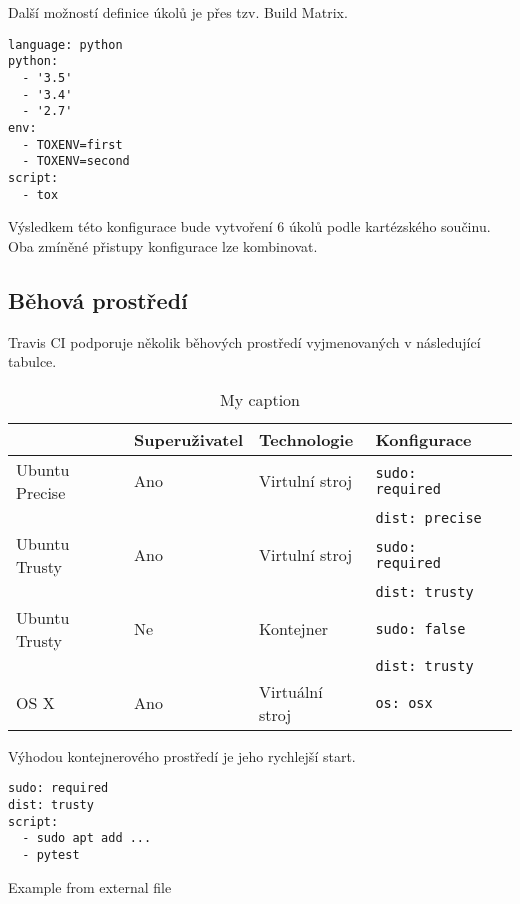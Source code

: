 Další možností definice úkolů je přes tzv. Build Matrix.

\begin{verbatim}
language: python
python:
  - '3.5'
  - '3.4'
  - '2.7'
env:
  - TOXENV=first
  - TOXENV=second
script:
  - tox
\end{verbatim}

Výsledkem této konfigurace bude vytvoření 6 úkolů podle kartézského součinu.
Oba zmíněné přistupy konfigurace lze kombinovat.


\subsection{Běhová prostředí}

Travis CI podporuje několik běhových prostředí vyjmenovaných v následující tabulce.

\begin{table}[h]
\centering
\caption{My caption}
\label{my-label}
\begin{tabular}{l|llll}
               & Superuživatel & Technologie & Konfigurace  \\ \hline
Ubuntu Precise & Ano & Virtulní stroj & \verb|sudo: required| &  \\ 
& & & \verb|dist: precise| &  \\ \hline
Ubuntu Trusty & Ano & Virtulní stroj & \verb|sudo: required|  &  \\
& & & \verb|dist: trusty| &  \\ \hline
Ubuntu Trusty & Ne & Kontejner & \verb|sudo: false|  &  \\
& & & \verb|dist: trusty| &  \\ \hline
OS X & Ano & Virtuální stroj & \verb|os: osx|  &  \\
\end{tabular}
\end{table}

Výhodou kontejnerového prostředí je jeho rychlejší start.


\begin{listing}[ht]
\begin{verbatim}
sudo: required
dist: trusty
script:
  - sudo apt add ...
  - pytest
\end{verbatim}
\caption{Example from external file}
\label{listing:3}
\end{listing}




